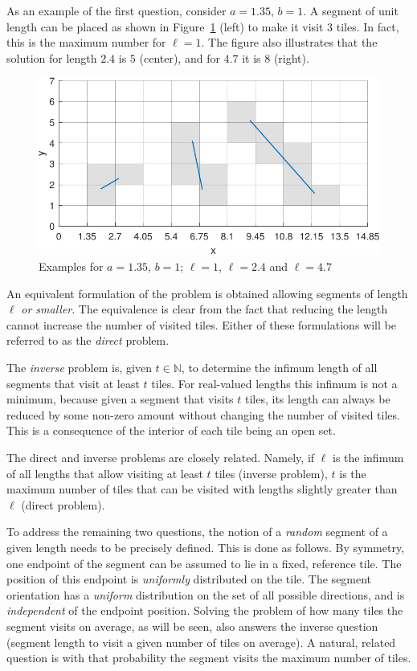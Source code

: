 \documentclass[12pt, a4paper]{article}
\newcommand{\len}{\ell} %
\newcommand{\tiles}{t} %
\begin{document}
As an example of the first question, consider $a=1.35$, $b=1$. A segment of unit length can be placed as shown in Figure~\ref{fig: examples} (left) to make it visit $3$ tiles. In fact, this is the maximum number for $\len=1$. The figure also illustrates that the solution for length $2.4$ is $5$ (center), and for $4.7$ it is $8$ (right).

\begin{figure}
\centering%
\includegraphics[width=.85\textwidth]{examples_1p35}%
\caption{Examples for $a=1.35$, $b=1$; $\len=1$, $\len=2.4$ and $\len=4.7$
}%
\label{fig: examples}%
\end{figure}%

An equivalent formulation of the problem is obtained allowing segments of length $\len$ \emph{or smaller}. The equivalence is clear from the fact that reducing the length cannot increase the number of visited tiles. Either of these formulations will be referred to as the \emph{direct} problem.

The \emph{inverse} problem is, given $\tiles \in \mathbb N$, to determine the infimum length of all segments that visit at least $\tiles$ tiles. For real-valued lengths this infimum is not a minimum, because given a segment that visits $\tiles$ tiles, its length can always be reduced by some non-zero amount without changing the number of visited tiles. This is a consequence of the interior of each tile being an open set.

The direct and inverse problems are closely related. Namely, if $\len$ is the infimum of all lengths that allow visiting at least $\tiles$ tiles (inverse problem), $\tiles$ is the maximum number of tiles that can be visited with lengths slightly greater than $\len$ (direct problem).

To address the remaining two questions, the notion of a \emph{random} segment of a given length needs to be precisely defined. This is done as follows. By symmetry, one endpoint of the segment can be assumed to lie in a fixed, reference tile. The position of this endpoint is \emph{uniformly} distributed on the tile. The segment orientation has a \emph{uniform} distribution on the set of all possible directions, and is \emph{independent} of the endpoint position. Solving the problem of how many tiles the segment visits on average, as will be seen, also answers the inverse question (segment length to visit a given number of tiles on average). A natural, related question is with that probability the segment visits the maximum number of tiles. 
\end{document}
